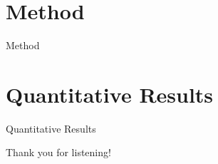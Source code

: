 \documentclass[aspectratio=169,t,xcolor=table,bottom=5cm]{beamer}
\theoremstyle{definition}
\begin{document}

















\section{Method}

\begin{frame}{Method}
\end{frame}






\section{Quantitative Results}

\begin{frame}{Quantitative Results}
\end{frame}



\begin{frame}{Thank you for listening!}
\end{frame}

\end{document}
